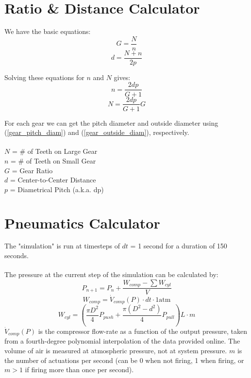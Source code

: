 \documentclass[11pt,a4paper,titlepage]{article}
\begin{document}
	\bigskip
	\section{Ratio \& Distance Calculator}
	We have the basic equations:
	\begin{equation}
		G = \frac{N}{n}
	\end{equation}
	\begin{equation}
		d = \frac{N + n}{2 p}
	\end{equation}
	
	Solving these equations for $n$ and $N$ gives:
	\begin{equation}
		n = \frac{2 d p}{G + 1}
	\end{equation}
	\begin{equation}
		N = \frac{2 d p}{G + 1} G
	\end{equation}
	
	For each gear we can get the pitch diameter and outside diameter using (\ref{gear_pitch_diam}) and (\ref{gear_outside_diam}), respectively. \\ \\
	$N$ = \# of Teeth on Large Gear \\
	$n$ = \# of Teeth on Small Gear \\
	$G$ = Gear Ratio \\
	$d$ = Center-to-Center Distance \\
	$p$ = Diametrical Pitch (a.k.a. dp)\\
	
	\newpage
	\section{Pneumatics Calculator}
	The "simulation" is run at timesteps of $dt$ = 1 second for a duration of 150 seconds. \\ \\
	
	The pressure at the current step of the simulation can be calculated by:
	\begin{equation} \label{pneu_press_timestep}
		P_{n+1} = P_n + \frac{W_{comp} - \sum W_{cyl}}{V}
	\end{equation}
	\begin{equation} \label{pneu_w_comp}
		W_{comp} = \dot{V}_{comp}(P) \cdot dt \cdot 1 \text{atm}
	\end{equation}
	\begin{equation} \label{pneu_w_cyl}
		W_{cyl} = \left( \frac{\pi D^2}{4} P_{push} + \frac{\pi (D^2 - d^2)}{4} P_{pull} \right) L \cdot m
	\end{equation}
	$\dot{V}_{comp}(P)$ is the compressor flow-rate as a function of the output pressure, taken from a fourth-degree polynomial interpolation of the data provided online. The volume of air is measured at atmospheric pressure, not at system pressure. $m$ is the number of actuations per second (can be 0 when not firing, 1 when firing, or $m>1$ if firing more than once per second). \\
	
\end{document}
